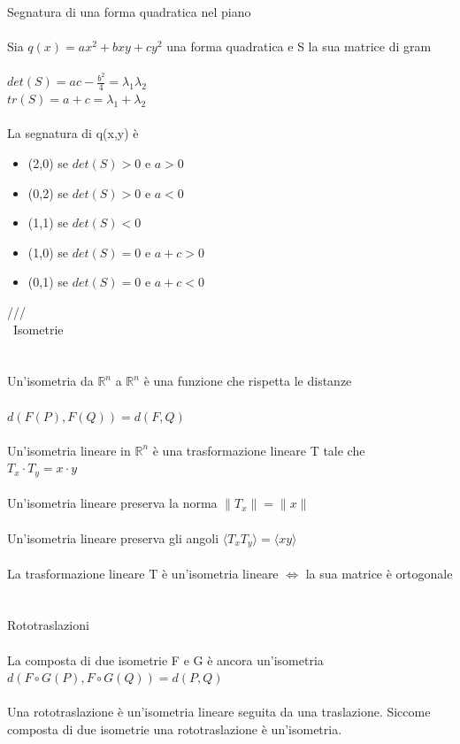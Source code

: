 \documentclass{article}
\begin{document}
{\large Segnatura di una forma quadratica nel piano}\\\\
Sia \(q(x)=ax^2+bxy+cy^2\) una forma quadratica e S la sua matrice di gram\\\\
\(det(S)= ac-\frac{b^2}{4}=\lambda_1\lambda_2\)\\
\(tr(S)=a+c=\lambda_1+\lambda_2\)\\\\
La segnatura di q(x,y) è 
\begin{itemize}
	\item (2,0) se \(det(S)>0\) e \(a>0\)
	\item (0,2) se \(det(S)>0\) e \(a<0\)
	\item (1,1) se \(det(S)<0\)
	\item (1,0) se \(det(S)=0\) e \(a+c>0\)
	\item (0,1) se \(det(S)=0\) e \(a+c<0\)
\end{itemize}
///\\\
{\large Isometrie}\\\\\\
Un'isometria da \(\mathbb{R}^n\) a \(\mathbb{R}^n\) è una funzione che rispetta le distanze\\\\
\(d(F(P),F(Q))=d(F,Q)\)\\\\
Un'isometria lineare in \(\mathbb{R}^n\) è una trasformazione lineare T tale che\\
\(T_x\cdot T_y = x\cdot y\)\\\\
Un'isometria lineare preserva la norma \(\|T_x\|=\|x\|\)\\\\
Un'isometria lineare preserva gli angoli \(\langle T_x T_y \rangle = \langle xy \rangle\)\\\\
La trasformazione lineare T è un'isometria lineare \(\iff\) la sua matrice è ortogonale\\\\\\
{\large Rototraslazioni}\\\\
La composta di due isometrie F e G è ancora un'isometria\\
\(d(F\circ G(P),F\circ G(Q))=d(P,Q)\)\\\\
Una rototraslazione è un'isometria lineare seguita da una traslazione. Siccome composta di due isometrie una rototraslazione è un'isometria.\\\\
\end{document}
